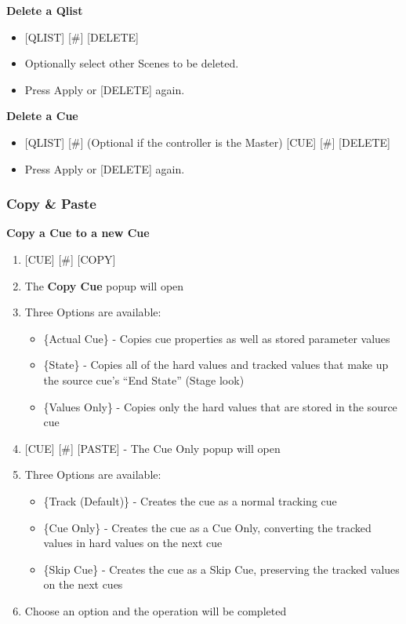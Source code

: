 \documentclass[
]{article}
\begin{document}
\textbf{Delete a Qlist}

\begin{itemize}
\item
  {[}QLIST{]} {[}\#{]} {[}DELETE{]}
\item
  Optionally select other Scenes to be deleted.
\item
  Press Apply or {[}DELETE{]} again.
\end{itemize}

\textbf{Delete a Cue}

\begin{itemize}
\item
  {[}QLIST{]} {[}\#{]} (Optional if the controller is the Master) {[}CUE{]} {[}\#{]} {[}DELETE{]}
\item
  Press Apply or {[}DELETE{]} again.
\end{itemize}

\hypertarget{copy-paste-1}{%
\subsubsection{Copy \& Paste}\label{copy-paste-1}}

\textbf{Copy a Cue to a new Cue}

\begin{enumerate}
\def\labelenumi{\arabic{enumi}.}
\item
  {[}CUE{]} {[}\#{]} {[}COPY{]}
\item
  The \textbf{Copy Cue} popup will open
\item
  Three Options are available:

  \begin{itemize}
  \item
    \{Actual Cue\} - Copies cue properties as well as stored parameter values
  \item
    \{State\} - Copies all of the hard values and tracked values that make up the source cue's ``End State'' (Stage look)
  \item
    \{Values Only\} - Copies only the hard values that are stored in the source cue
  \end{itemize}
\item
  {[}CUE{]} {[}\#{]} {[}PASTE{]} - The Cue Only popup will open
\item
  Three Options are available:

  \begin{itemize}
  \item
    \{Track (Default)\} - Creates the cue as a normal tracking cue
  \item
    \{Cue Only\} - Creates the cue as a Cue Only, converting the tracked values in hard values on the next cue
  \item
    \{Skip Cue\} - Creates the cue as a Skip Cue, preserving the tracked values on the next cues
  \end{itemize}
\item
  Choose an option and the operation will be completed
\end{enumerate}
\end{document}
